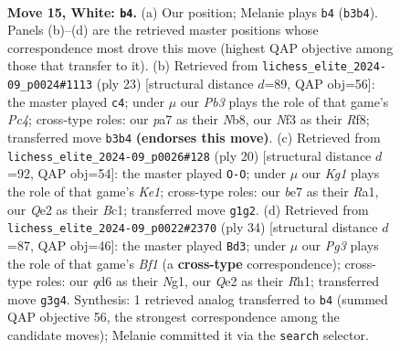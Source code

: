 \documentclass[11pt]{article}
\begin{document}
\clearpage

\begin{figure}[p]\centering
\begin{subfigure}{0.46\textwidth}\centering
\resizebox{\linewidth}{!}{%
\newchessgame
\chessboard[
  setfen={rnb1kr2/p3b1pp/1p1q1n2/2pp1p2/3P3P/PP2PNPB/4QP2/RNB1R1K1 w - - 0 15},
  showmover=false,
  pgfstyle=straightmove, color=movearrow, markmove={b3-b4}
]}
\caption{}
\end{subfigure}\hfill
\begin{subfigure}{0.46\textwidth}\centering
\resizebox{\linewidth}{!}{%
\newchessgame
\chessboard[
  setfen={rnbq1rk1/3n1pbp/p2p2p1/1ppP4/P3P3/3B1N1P/1P1N1PP1/R1BQR1K1 b - - 0 12},
  showmover=false,
  pgfstyle=straightmove, color=movearrow, markmove={c5-c4}
]}
\caption{}
\end{subfigure}
\\[4pt]
\begin{subfigure}{0.46\textwidth}\centering
\resizebox{\linewidth}{!}{%
\newchessgame
\chessboard[
  setfen={r1q1k2r/pp1nbpp1/2pp1np1/4p3/2PP4/1Q2P1P1/PP1N1PBP/R1B1K2R w KQkq - 1 11},
  showmover=false,
  pgfstyle=straightmove, color=movearrow, markmove={e1-g1}
]}
\caption{}
\end{subfigure}\hfill
\begin{subfigure}{0.46\textwidth}\centering
\resizebox{\linewidth}{!}{%
\newchessgame
\chessboard[
  setfen={r4k1r/bpqb1ppp/p1n1p3/3nP2P/2Np1PP1/P4Q2/1PP2B2/R2K1BNR w - - 11 18},
  showmover=false,
  pgfstyle=straightmove, color=movearrow, markmove={f1-d3}
]}
\caption{}
\end{subfigure}
\caption{\textbf{Move 15, White: \texttt{b4}.} (a) Our position; Melanie plays \texttt{b4} (\texttt{b3b4}). Panels (b)--(d) are the retrieved master positions whose correspondence most drove this move (highest QAP objective among those that transfer to it). (b) Retrieved from \texttt{lichess\_elite\_2024-09\_p0024\#1113} (ply 23) [structural distance $d$=89, QAP obj=56]: the master played \texttt{c4}; under $\mu$ our \emph{Pb3} plays the role of that game's \emph{Pc4}; cross-type roles: our \emph{p}a7 as their \emph{N}b8, our \emph{N}f3 as their \emph{R}f8; transferred move \texttt{b3b4} \textbf{(endorses this move)}. (c) Retrieved from \texttt{lichess\_elite\_2024-09\_p0026\#128} (ply 20) [structural distance $d$=92, QAP obj=54]: the master played \texttt{O-O}; under $\mu$ our \emph{Kg1} plays the role of that game's \emph{Ke1}; cross-type roles: our \emph{b}e7 as their \emph{R}a1, our \emph{Q}e2 as their \emph{B}c1; transferred move \texttt{g1g2}. (d) Retrieved from \texttt{lichess\_elite\_2024-09\_p0022\#2370} (ply 34) [structural distance $d$=87, QAP obj=46]: the master played \texttt{Bd3}; under $\mu$ our \emph{Pg3} plays the role of that game's \emph{Bf1} (a \textbf{cross-type} correspondence); cross-type roles: our \emph{q}d6 as their \emph{N}g1, our \emph{Q}e2 as their \emph{R}h1; transferred move \texttt{g3g4}. Synthesis: 1 retrieved analog transferred to \texttt{b4} (summed QAP objective 56, the strongest correspondence among the candidate moves); Melanie committed it via the \texttt{search} selector.}
\label{fig:thought-m28}
\end{figure}
\end{document}
